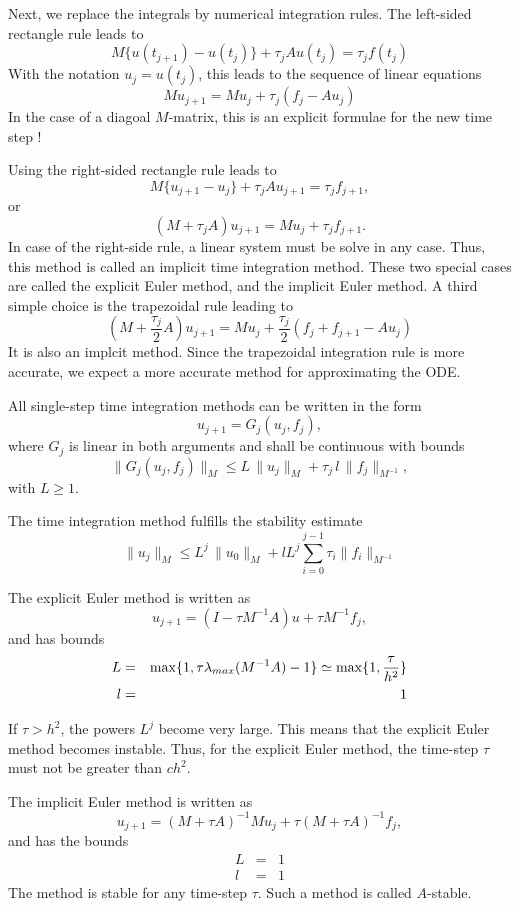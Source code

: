 Next, we replace the integrals by numerical integration rules. The left-sided rectangle rule
leads to
$$
M \{ u(t_{j+1}) - u(t_j) \} + \tau_j A u(t_j) = \tau_j f(t_j)
$$
With the notation $u_j = u(t_j)$, this leads to the sequence of linear equations
$$
M u_{j+1} = M u_j + \tau_j (f_j - A u_j)
$$
In the case of a diagoal $M$-matrix, this is an explicit formulae for the new time step !

Using the right-sided rectangle rule leads to
$$
M \{ u_{j+1} - u_j \} + \tau_j A u_{j+1} = \tau_j f_{j+1},
$$
or
$$
(M + \tau_j A) u_{j+1} = M u_j + \tau_j f_{j+1}.
$$
In case of the right-side rule, a linear system must be solve in any case. Thus,
this method is called an implicit time integration method. These two special cases
are called the explicit Euler method, and the implicit Euler method. A third simple
choice is the trapezoidal rule leading to
$$
(M + \frac{\tau_j}{2} A) u_{j+1} = M u_j + \frac{\tau_j}{2} (f_j+f_{j+1} - A u_j)
$$
It is also an implcit method. Since the trapezoidal integration rule is more accurate,
we expect a more accurate method for approximating the ODE.



All single-step time integration methods can be written in the form
$$
u_{j+1} = G_j (u_j, f_j),
$$
where $G_j$ is linear in both arguments and shall be continuous with bounds
$$
\| G_j (u_j, f_j) \|_M \leq L \, \| u_j \|_M + \tau_j \, l \, \| f_j \|_{M^{-1}},
$$
with $L \geq 1$.
\begin{lemma}
The time integration method fulfills the stability estimate
\begin{equation}
\| u_j \|_M \leq L^j \, \| u_0 \|_M + l L^j \sum_{i=0}^{j-1} \tau_i \| f_i \|_{M^{-1}}
\end{equation}
\end{lemma}

The explicit Euler method is written as
$$
u_{j+1} = (I - \tau M^{-1} A) u + \tau M^{-1} f_j,
$$
and has bounds
\begin{eqnarray*}
L & = & \max \{ 1, \tau \lambda_{max} (M^{-1} A)-1 \} \simeq \max\{ 1, \frac{\tau}{h^2} \}\\
l & = & 1
\end{eqnarray*}

If $\tau > h^2$, the powers $L^j$ become very large. This means that the explicit Euler
method becomes instable. Thus, for the explicit Euler method, the time-step $\tau$
must not be greater than $c h^2$.

The implicit Euler method is written as
$$
u_{j+1} = (M + \tau A)^{-1} M u_j + \tau (M+\tau A)^{-1} f_j,
$$
and has the bounds
\begin{eqnarray*}
L & = & 1 \\
l & = & 1
\end{eqnarray*}
The method is stable for any time-step $\tau$. Such a method is called $A$-stable.

